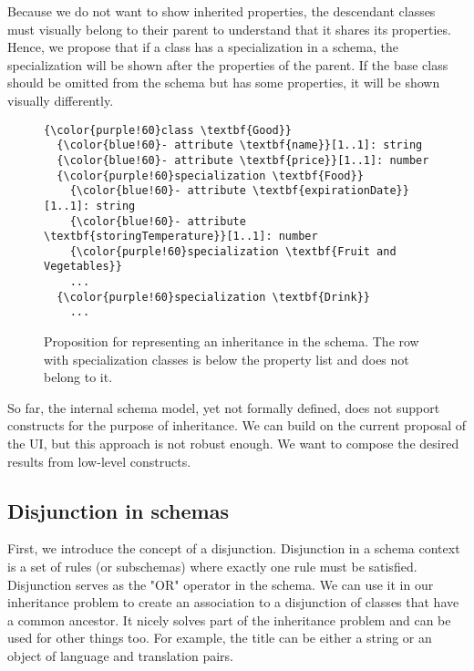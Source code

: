 \medskip

Because we do not want to show inherited properties, the descendant classes must visually belong to their parent to understand that it shares its properties. Hence, we propose that if a class has a specialization in a schema, the specialization will be shown after the properties of the parent. If the base class should be omitted from the schema but has some properties, it will be shown visually differently.

\begin{figure}[h!]\centering
  \begin{Verbatim}[commandchars=\\\{\}]
{\color{purple!60}class \textbf{Good}}
  {\color{blue!60}- attribute \textbf{name}}[1..1]: string
  {\color{blue!60}- attribute \textbf{price}}[1..1]: number
  {\color{purple!60}specialization \textbf{Food}}
    {\color{blue!60}- attribute \textbf{expirationDate}}[1..1]: string
    {\color{blue!60}- attribute \textbf{storingTemperature}}[1..1]: number
    {\color{purple!60}specialization \textbf{Fruit and Vegetables}}
    ...
  {\color{purple!60}specialization \textbf{Drink}}
    ...
\end{Verbatim}
  \caption{Proposition for representing an inheritance in the schema. The row with specialization classes is below the property list and does not belong to it.}
\end{figure}

So far, the internal schema model, yet not formally defined, does not support constructs for the purpose of inheritance. We can build on the current proposal of the UI, but this approach is not robust enough. We want to compose the desired results from low-level constructs.

\subsection{Disjunction in schemas}

First, we introduce the concept of a disjunction. Disjunction in a schema context is a set of rules (or subschemas) where exactly one rule must be satisfied. Disjunction serves as the "OR" operator in the schema. We can use it in our inheritance problem to create an association to a disjunction of classes that have a common ancestor. It nicely solves part of the inheritance problem and can be used for other things too. For example, the title can be either a string or an object of language and translation pairs.


